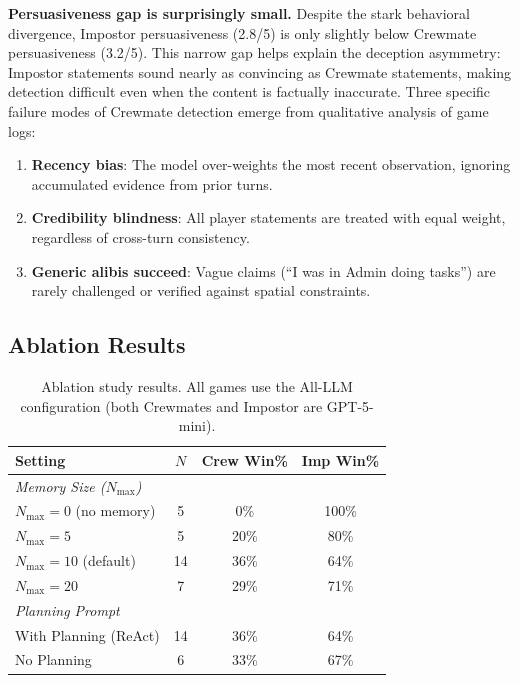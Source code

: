 \documentclass{article}
\begin{document}
\textbf{Persuasiveness gap is surprisingly small.} Despite the stark behavioral divergence, Impostor persuasiveness (2.8/5) is only slightly below Crewmate persuasiveness (3.2/5). This narrow gap helps explain the deception asymmetry: Impostor statements sound nearly as convincing as Crewmate statements, making detection difficult even when the content is factually inaccurate. Three specific failure modes of Crewmate detection emerge from qualitative analysis of game logs:
\begin{enumerate}
    \item \textbf{Recency bias}: The model over-weights the most recent observation, ignoring accumulated evidence from prior turns.
    \item \textbf{Credibility blindness}: All player statements are treated with equal weight, regardless of cross-turn consistency.
    \item \textbf{Generic alibis succeed}: Vague claims (``I was in Admin doing tasks'') are rarely challenged or verified against spatial constraints.
\end{enumerate}

\subsection{Ablation Results}

\begin{table}[h]
\centering
\caption{Ablation study results. All games use the All-LLM configuration (both Crewmates and Impostor are GPT-5-mini).}
\label{tab:ablations}
\begin{tabular}{lccc}
\toprule
Setting & $N$ & Crew Win\% & Imp Win\% \\
\midrule
\multicolumn{4}{l}{\textit{Memory Size ($N_{\max}$)}} \\
$N_{\max}=0$ (no memory) & 5 & 0\% & 100\% \\
$N_{\max}=5$ & 5 & 20\% & 80\% \\
$N_{\max}=10$ (default) & 14 & 36\% & 64\% \\
$N_{\max}=20$ & 7 & 29\% & 71\% \\
\midrule
\multicolumn{4}{l}{\textit{Planning Prompt}} \\
With Planning (ReAct) & 14 & 36\% & 64\% \\
No Planning & 6 & 33\% & 67\% \\
\bottomrule
\end{tabular}
\end{table}
\end{document}
